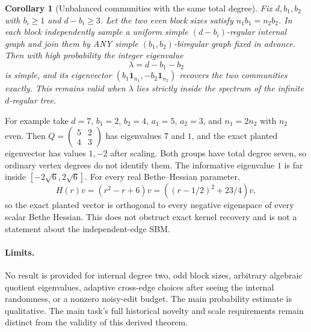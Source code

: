 \documentclass[11pt]{article}
\newtheorem{corollary}{Corollary}
\newcommand{\one}{\mathbf1}
\begin{document}
\begin{corollary}[Unbalanced communities with the same total degree]
Fix $d,b_1,b_2$ with $b_i\geq1$ and $d-b_i\geq3$. Let the two even
block sizes satisfy $n_1b_1=n_2b_2$. In each block independently sample a
uniform simple $(d-b_i)$-regular internal graph and join them by ANY
simple $(b_1,b_2)$-biregular graph fixed in advance. Then with high
probability the integer eigenvalue
\[
 \lambda=d-b_1-b_2
\]
is simple, and its eigenvector
$(b_1\one_{n_1},-b_2\one_{n_2})$ recovers the two communities exactly.
This remains valid when $\lambda$ lies strictly inside the spectrum of
the infinite $d$-regular tree.
\end{corollary}

For example take $d=7$, $b_1=2$, $b_2=4$, $a_1=5$, $a_2=3$, and
$n_1=2n_2$ with $n_2$ even. Then $Q=\left(\begin{smallmatrix}5&2\\4&3
\end{smallmatrix}\right)$ has eigenvalues $7$ and $1$, and the exact
planted eigenvector has values $1,-2$ after scaling. Both groups have
total degree seven, so ordinary vertex degrees do not identify them.
The informative eigenvalue $1$ is far inside $[-2\sqrt6,2\sqrt6]$.
For every real Bethe--Hessian parameter,
\[
 H(r)v=(r^2-r+6)v=((r-1/2)^2+23/4)v,
\]
so the exact planted vector is orthogonal to every negative eigenspace
of every scalar Bethe Hessian. This does not obstruct exact kernel
recovery and is not a statement about the independent-edge SBM.

\paragraph{Limits.}
No result is provided for internal degree two, odd block sizes, arbitrary
algebraic quotient eigenvalues, adaptive cross-edge choices after seeing
the internal randomness, or a nonzero noisy-edit budget. The main
probability estimate is qualitative. The main task's full historical
novelty and scale requirements remain distinct from the validity of this
derived theorem.
\end{document}

